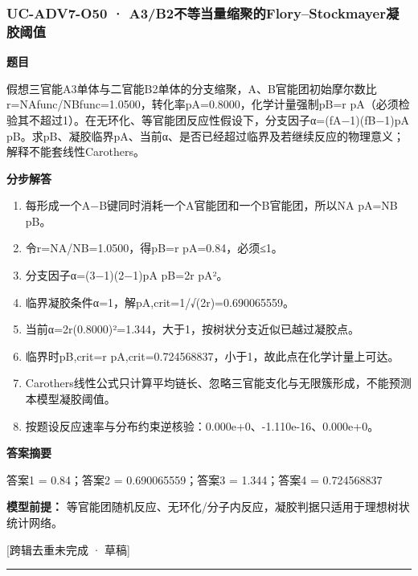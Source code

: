\documentclass[UTF8,11pt,a4paper]{ctexart}
\begin{document}
\subsubsection*{UC-ADV7-O50 · A3/B2不等当量缩聚的Flory–Stockmayer凝胶阈值}
\noindent\textbf{题目}\par
假想三官能A3单体与二官能B2单体的分支缩聚，A、B官能团初始摩尔数比r=NAfunc/NBfunc=1.0500，转化率pA=0.8000，化学计量强制pB=r pA（必须检验其不超过1）。在无环化、等官能团反应性假设下，分支因子α=(fA−1)(fB−1)pA pB。求pB、凝胶临界pA、当前α、是否已经超过临界及若继续反应的物理意义；解释不能套线性Carothers。\par
\medskip\noindent\textbf{分步解答}
\begin{enumerate}
\item 每形成一个A−B键同时消耗一个A官能团和一个B官能团，所以NA pA=NB pB。
\item 令r=NA/NB=1.0500，得pB=r pA=0.84，必须≤1。
\item 分支因子α=(3−1)(2−1)pA pB=2r pA²。
\item 临界凝胶条件α=1，解pA,crit=1/√(2r)=0.690065559。
\item 当前α=2r(0.8000)²=1.344，大于1，按树状分支近似已越过凝胶点。
\item 临界时pB,crit=r pA,crit=0.724568837，小于1，故此点在化学计量上可达。
\item Carothers线性公式只计算平均链长、忽略三官能支化与无限簇形成，不能预测本模型凝胶阈值。
\item 按题设反应速率与分布约束逆核验：0.000e+0、-1.110e-16、0.000e+0。
\end{enumerate}
\noindent\textbf{答案摘要}\par
答案1 = 0.84；答案2 = 0.690065559；答案3 = 1.344；答案4 = 0.724568837\par
\noindent\textbf{模型前提：}
等官能团随机反应、无环化/分子内反应，凝胶判据只适用于理想树状统计网络。\par
\noindent\textcolor{red!65!black}{[跨辑去重未完成 · 草稿]} \par
\medskip\hrule\medskip
{}
\end{document}
